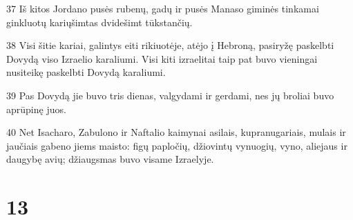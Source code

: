 \par 37 Iš kitos Jordano pusės rubenų, gadų ir pusės Manaso giminės tinkamai ginkluotų karių­šimtas dvidešimt tūkstančių. 
\par 38 Visi šitie kariai, galintys eiti rikiuotėje, atėjo į Hebroną, pasiryžę paskelbti Dovydą viso Izraelio karaliumi. Visi kiti izraelitai taip pat buvo vieningai nusiteikę paskelbti Dovydą karaliumi. 
\par 39 Pas Dovydą jie buvo tris dienas, valgydami ir gerdami, nes jų broliai buvo aprūpinę juos. 
\par 40 Net Isacharo, Zabulono ir Naftalio kaimynai asilais, kupranugariais, mulais ir jaučiais gabeno jiems maisto: figų papločių, džiovintų vynuogių, vyno, aliejaus ir daugybę avių; džiaugsmas buvo visame Izraelyje.



\chapter{13}


